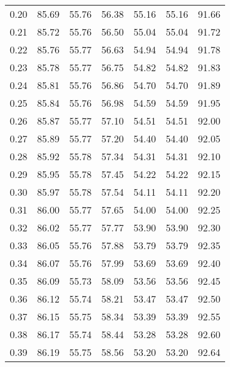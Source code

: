\begin{tabular}{|c|c|c|c|c|c|c|}
      0.20 &     85.69 &     55.76 &      56.38 &   55.16 &      55.16 &         91.66 \\
      0.21 &     85.72 &     55.76 &      56.50 &   55.04 &      55.04 &         91.72 \\
      0.22 &     85.76 &     55.77 &      56.63 &   54.94 &      54.94 &         91.78 \\
      0.23 &     85.78 &     55.77 &      56.75 &   54.82 &      54.82 &         91.83 \\
      0.24 &     85.81 &     55.76 &      56.86 &   54.70 &      54.70 &         91.89 \\
      0.25 &     85.84 &     55.76 &      56.98 &   54.59 &      54.59 &         91.95 \\
      0.26 &     85.87 &     55.77 &      57.10 &   54.51 &      54.51 &         92.00 \\
      0.27 &     85.89 &     55.77 &      57.20 &   54.40 &      54.40 &         92.05 \\
      0.28 &     85.92 &     55.78 &      57.34 &   54.31 &      54.31 &         92.10 \\
      0.29 &     85.95 &     55.78 &      57.45 &   54.22 &      54.22 &         92.15 \\
      0.30 &     85.97 &     55.78 &      57.54 &   54.11 &      54.11 &         92.20 \\
      0.31 &     86.00 &     55.77 &      57.65 &   54.00 &      54.00 &         92.25 \\
      0.32 &     86.02 &     55.77 &      57.77 &   53.90 &      53.90 &         92.30 \\
      0.33 &     86.05 &     55.76 &      57.88 &   53.79 &      53.79 &         92.35 \\
      0.34 &     86.07 &     55.76 &      57.99 &   53.69 &      53.69 &         92.40 \\
      0.35 &     86.09 &     55.73 &      58.09 &   53.56 &      53.56 &         92.45 \\
      0.36 &     86.12 &     55.74 &      58.21 &   53.47 &      53.47 &         92.50 \\
      0.37 &     86.15 &     55.75 &      58.34 &   53.39 &      53.39 &         92.55 \\
      0.38 &     86.17 &     55.74 &      58.44 &   53.28 &      53.28 &         92.60 \\
      0.39 &     86.19 &     55.75 &      58.56 &   53.20 &      53.20 &         92.64 \\

\end{tabular}
